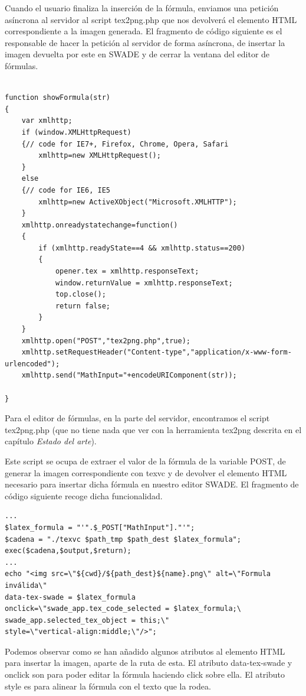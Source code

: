 Cuando el usuario finaliza la inserción de la fórmula, enviamos una petición asíncrona al servidor al script tex2png.php que nos devolverá el elemento HTML correspondiente a la imagen generada. El fragmento de código siguiente es el responsable de hacer la petición al servidor de forma asíncrona, de insertar la imagen devuelta por este en SWADE y de cerrar la ventana del editor de fórmulas. 

\begin{verbatim}

function showFormula(str)
{
    var xmlhttp;
    if (window.XMLHttpRequest)
    {// code for IE7+, Firefox, Chrome, Opera, Safari
        xmlhttp=new XMLHttpRequest();
    }
    else
    {// code for IE6, IE5
        xmlhttp=new ActiveXObject("Microsoft.XMLHTTP");
    }
    xmlhttp.onreadystatechange=function()
    {
        if (xmlhttp.readyState==4 && xmlhttp.status==200)
        {
            opener.tex = xmlhttp.responseText;
            window.returnValue = xmlhttp.responseText;
            top.close();
            return false;
        }
    }
    xmlhttp.open("POST","tex2png.php",true);
    xmlhttp.setRequestHeader("Content-type","application/x-www-form-urlencoded");
    xmlhttp.send("MathInput="+encodeURIComponent(str));

}

\end{verbatim}

Para el editor de fórmulas, en la parte del servidor, encontramos el script tex2png.php (que no tiene nada que ver con la herramienta tex2png descrita en el capítulo \emph{Estado del arte}).

Este script se ocupa de extraer el valor de la fórmula de la variable POST, de generar la imagen correspondiente con texvc y de devolver el elemento HTML necesario para insertar dicha fórmula en nuestro editor SWADE. El fragmento de código siguiente recoge dicha funcionalidad.

\begin{verbatim}
...
$latex_formula = "'".$_POST["MathInput"]."'";
$cadena = "./texvc $path_tmp $path_dest $latex_formula";
exec($cadena,$output,$return);
...
echo "<img src=\"${cwd}/${path_dest}${name}.png\" alt=\"Formula inválida\" 
data-tex-swade = $latex_formula 
onclick=\"swade_app.tex_code_selected = $latex_formula;\
swade_app.selected_tex_object = this;\" 
style=\"vertical-align:middle;\"/>";
\end{verbatim}

Podemos observar como se han añadido algunos atributos al elemento HTML para insertar la imagen, aparte de la ruta de esta. El atributo data-tex-swade y onclick son para poder editar la fórmula haciendo click sobre ella. El atributo style es para alinear la fórmula con el texto que la rodea.


